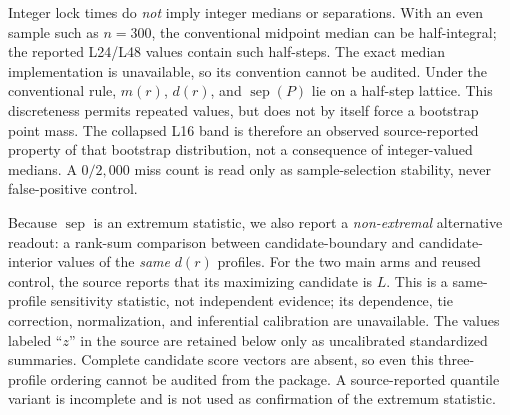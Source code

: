 \documentclass{article}
\begin{document}
Integer lock times do \emph{not} imply integer medians or separations.  With an
even sample such as $n=300$, the conventional midpoint median can be
half-integral; the reported L24/L48 values contain such half-steps.  The exact
median implementation is unavailable, so its convention cannot be audited.
Under the conventional rule, $m(r)$, $d(r)$, and $\operatorname{sep}(P)$ lie on
a half-step lattice.  This discreteness permits repeated values, but does not by
itself force a bootstrap point mass.  The collapsed L16 band is therefore an
observed source-reported property of that bootstrap distribution, not a
consequence of integer-valued medians.  A $0/2{,}000$ miss count is read only as
sample-selection stability, never false-positive control.

Because $\operatorname{sep}$ is an extremum statistic, we also report a
\emph{non-extremal} alternative readout: a rank-sum comparison between
candidate-boundary and candidate-interior values of the \emph{same} $d(r)$
profiles.  For the two main arms and reused control, the source reports that its
maximizing candidate is $L$.  This is a same-profile sensitivity statistic, not
independent evidence; its dependence, tie correction, normalization, and
inferential calibration are unavailable.  The values labeled ``$z$'' in the
source are retained below only as uncalibrated standardized summaries. Complete
candidate score vectors are absent, so even this three-profile ordering cannot
be audited from the package. A source-reported quantile variant is incomplete
and is not used as confirmation of the extremum statistic.
\end{document}
